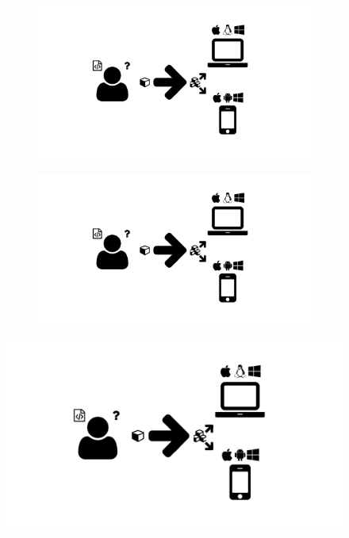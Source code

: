 \begin{figure}
  \centering
  \begin{subfigure}[b]{\textwidth}
    \includegraphics[width=\textwidth,page=13,trim=0.37cm 3.65cm 13.1cm 3.3cm, clip=true]{images/Figures.pdf}
    \caption{}
    \label{Figure:}
  \end{subfigure}
  \begin{subfigure}[b]{\textwidth}
    \includegraphics[width=\textwidth,page=13,trim=13.1cm 3.65cm 0.37cm 3.3cm, clip=true]{images/Figures.pdf}
    \caption{}
    \label{Figure:}
  \end{subfigure}
  \caption{}
  \label{Figure:}
\end{figure}

\begin{figure}
  \centering
  \includegraphics[width=\textwidth,page=14,trim=0.37cm .65cm 0.37cm 0.3cm, clip=true]{images/Figures.pdf}
  \caption{}
  \label{Figure:}
\end{figure}

